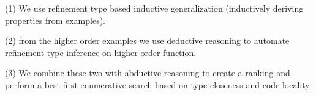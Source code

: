 (1) We use refinement type based inductive generalization (inductively deriving properties from examples).

(2) from the higher order examples we use deductive reasoning to automate refinement type inference on higher order function.

(3) We combine these two with abductive reasoning to create a ranking and perform a best-first enumerative search based on type closeness and code locality. 
